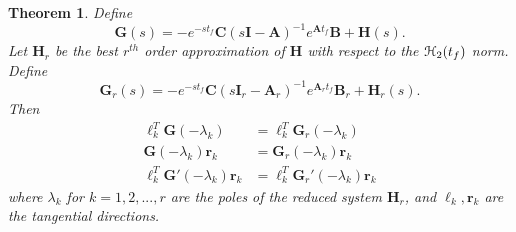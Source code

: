 \documentclass[preprint]{elsarticle}
\newtheorem{theorem}{Theorem}[section]
\theoremstyle{definition}
\theoremstyle{definition}
\def\mathcal{\EuScript}
\numberwithin{equation}{section}
\newcommand{\A}{\mathbf{A}}
\newcommand{\B}{\mathbf{B}}
\newcommand{\I}{\mathbf{I}}
\newcommand{\G}{\mathbf{G}}
\newcommand{\C}{\mathbf{C}}
\newcommand{\HH}{\mathbf{H}}
\newcommand{\tf}{t_f}
\newcommand{\rc}{\boldsymbol{r}}
\newcommand{\lc}{\boldsymbol{\ell}}
\newcommand{\ch}{\mathcal{H}}
\begin{document}
\begin{theorem}\label{mh2opt}
Define
 \[\G(s)=-e^{-s\tf}\C(s\I-\A)^{-1}e^{\A \tf}\B+\HH(s).\]
Let $\HH_r$ be the best $r^{th}$ order approximation of $\HH$ with respect to the $\ch_2(\tf)$ norm.
Define 
\[\G_r(s)=-e^{-s\tf}\C(s\I_r-\A_r)^{-1}e^{\A_r \tf}\B_r+\HH_r(s).\]
 Then
\begin{align*}
\lc_k^T\G(-\lambda_k)&=\lc_k^T\G_r(-\lambda_k)\\
\G(-\lambda_k)\rc_k&=\G_r(-\lambda_k)\rc_k\\
\lc_k^T\G'(-\lambda_k)\rc_k&=\lc_k^T\G_r'(-\lambda_k)\rc_k
\end{align*}
where  $\lambda_k$ for $k=1, 2, ... , r$ are the poles of the reduced system $\HH_r$, and $\lc_k, \rc_k$ are the tangential directions.

\end{theorem}
\end{document}
